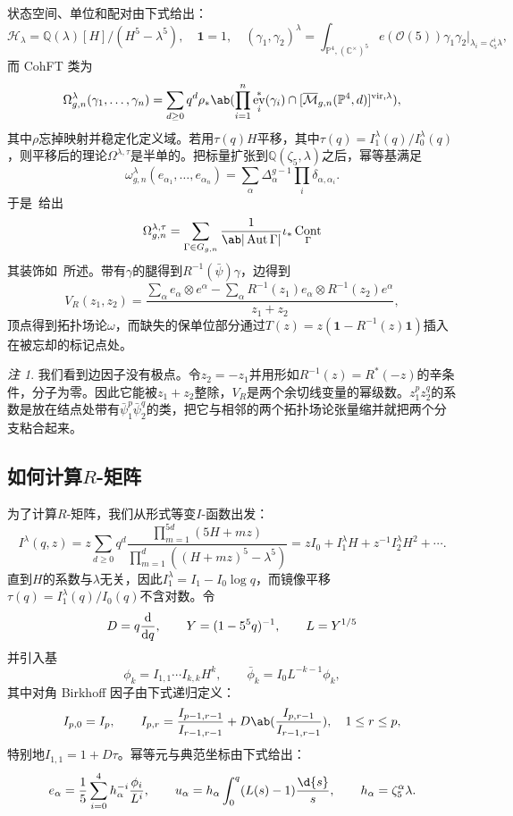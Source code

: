 \documentclass{amsart}
\theoremstyle{definition}
\theoremstyle{remark}
\newtheorem{rmk}[thm]{注}
\theoremstyle{plain}
\theoremstyle{definition}
\theoremstyle{remark}
\newcommand{\C}{\mathbb{C}}
\newcommand{\Q}{\mathbb{Q}}
\renewcommand{\P}{\mathbb{P}}
\newcommand{\Mbar}{\overline{\mathcal{M}}}
\newcommand{\mc}[1]{\mathcal{#1}}
\newcommand{\mr}[1]{\mathrm{#1}}
\newcommand{\1}{\mathbf{1}}
\newcommand{\2}{\mathbf{2}}
\newcommand{\3}{\mathbf{3}}
\newcommand{\vir}{\mr{vir}}
\DeclareMathOperator{\Aut}{Aut}
\DeclareMathOperator{\ev}{ev}
\DeclareMathOperator{\Cont}{Cont}
\begin{document}
状态空间、单位和配对由下式给出：
\[ \mc{H}_{\lambda} = \Q(\lambda)[H]/(H^5-\lambda^5), \quad \1 = 1, \quad (\gamma_1,\gamma_2)^{\lambda} = \int_{\P^4, (\C^{\times})^5} e(\mc{O}(5))\gamma_1\gamma_2 \Big|_{\lambda_i = \zeta_5^i\lambda}, \]
而 CohFT 类为
\[ \Omega^{\lambda}_{g,n}(\gamma_1, \ldots, \gamma_n) = \sum_{d \geq 0} q^d \rho_* \ab( \prod_{i=1}^n \ev_i^*(\gamma_i) \cap [\Mbar_{g,n}(\P^4,d)]^{\vir,\lambda}), \]
其中\(\rho\)忘掉映射并稳定化定义域。若用\(\tau(q)H\)平移，其中\(\tau(q) = I^{\lambda}_1(q)/I^{\lambda}_0(q)\)，则平移后的理论\(\Omega^{\lambda,\tau}\)是半单的。把标量扩张到\(\Q(\zeta_5,\lambda)\)之后，幂等基满足
\[ \omega^{\lambda}_{g,n}(e_{\alpha_1}, \ldots, e_{\alpha_n}) = \sum_{\alpha}\Delta_{\alpha}^{g-1}\prod_i \delta_{\alpha,\alpha_i}. \]
于是~给出
\[ \Omega^{\lambda,\tau}_{g,n} = \sum_{\Gamma \in G_{g,n}} \frac{1}{\ab|\Aut\Gamma|}\iota_* \Cont_{\Gamma} \]
其装饰如~所述。带有\(\gamma\)的腿得到\(R^{-1}(\bar{\psi})\gamma\)，边得到
\[ V_R(z_1,z_2) = \frac{\sum_{\alpha} e_{\alpha}\otimes e^{\alpha} - \sum_{\alpha} R^{-1}(z_1)e_{\alpha} \otimes R^{-1}(z_2)e^{\alpha}}{z_1+z_2}, \]
顶点得到拓扑场论\(\omega\)，而缺失的保单位部分通过\(T(z) = z(\1 - R^{-1}(z)\1)\)插入在被忘却的标记点处。

\begin{rmk}
    我们看到边因子没有极点。令\(z_2 = -z_1\)并用形如\(R^{-1}(z) = R^*(-z)\)的辛条件，分子为零。因此它能被\(z_1+z_2\)整除，\(V_R\)是两个余切线变量的幂级数。\(z_1^p z_2^q\)的系数是放在结点处带有\(\bar{\psi}_1^p \bar{\psi}_2^q\)的类，把它与相邻的两个拓扑场论张量缩并就把两个分支粘合起来。
\end{rmk}

\subsection{如何计算\(R\)-矩阵}%
\label{sub:How to compute the R-matrix (Guo)}

为了计算\(R\)-矩阵，我们从形式等变\(I\)-函数出发：
\[ I^{\lambda}(q,z) = z\sum_{d\geq0}q^d \frac{\prod_{m=1}^{5d}(5H+mz)}{\prod_{m=1}^d ((H+mz)^5 - \lambda^5)} = zI_0 + I_1^{\lambda}H + z^{-1}I_2^{\lambda}H^2 + \cdots. \]
直到\(H\)的系数与\(\lambda\)无关，因此\(I_1^{\lambda} = I_1 - I_0 \log q\)，而镜像平移\(\tau(q) = I_1^{\lambda}(q)/I_0(q)\)不含对数。令
\[ D = q\odv{}{q}, \qquad Y = (1-5^5q)^{-1}, \qquad L = Y^{1/5} \]
并引入基
\[ \phi_k = I_{1,1}\cdots I_{k,k}H^k, \qquad \bar{\phi}_k = I_0 L^{-k-1}\phi_k, \]
其中对角 Birkhoff 因子由下式递归定义：
\[ I_{p,0} = I_p, \qquad I_{p,r} = \frac{I_{p-1,r-1}}{I_{r-1,r-1}} + D \ab( \frac{I_{p,r-1}}{I_{r-1,r-1}}), \quad 1 \leq r \leq p, \]
特别地\(I_{1,1} = 1+D\tau\)。幂等元与典范坐标由下式给出：
\[ e_{\alpha} = \frac{1}{5}\sum_{i=0}^4 h_{\alpha}^{-i}\frac{\phi_i}{L^i}, \qquad u_{\alpha} = h_{\alpha}\int_0^q (L(s)-1)\frac{\d{s}}{s}, \qquad h_{\alpha} = \zeta_5^{\alpha}\lambda. \]
\end{document}
